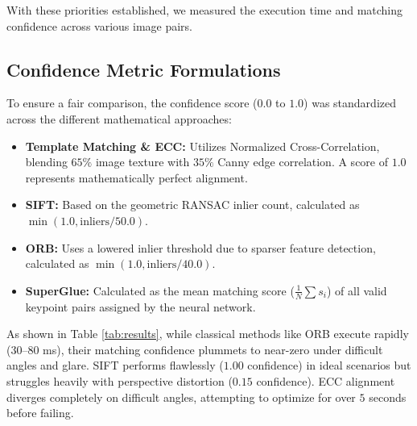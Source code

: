 \documentclass[conference]{IEEEtran}
\begin{document}
With these priorities established, we measured the execution time and matching confidence across various image pairs.





\subsection{Confidence Metric Formulations}

To ensure a fair comparison, the confidence score ($0.0$ to $1.0$) was standardized across the different mathematical approaches:
\begin{itemize}[noitemsep]
    \item \textbf{Template Matching \& ECC:} Utilizes Normalized Cross-Correlation, blending $65\%$ image texture with $35\%$ Canny edge correlation. A score of $1.0$ represents mathematically perfect alignment.
    \item \textbf{SIFT:} Based on the geometric RANSAC inlier count, calculated as $\min(1.0, \text{inliers} / 50.0)$.
    \item \textbf{ORB:} Uses a lowered inlier threshold due to sparser feature detection, calculated as $\min(1.0, \text{inliers} / 40.0)$.
    \item \textbf{SuperGlue:} Calculated as the mean matching score ($\frac{1}{N} \sum s_i$) of all valid keypoint pairs assigned by the neural network.
\end{itemize}




As shown in Table \ref{tab:results}, while classical methods like ORB execute rapidly ($30$--$80$ ms), their matching confidence plummets to near-zero under difficult angles and glare. SIFT performs flawlessly ($1.00$ confidence) in ideal scenarios but struggles heavily with perspective distortion ($0.15$ confidence). ECC alignment diverges completely on difficult angles, attempting to optimize for over $5$ seconds before failing. 

\begin{table}[htbp]
\centering
\caption{Performance Comparison across Image Pairs (Confidence / Execution Time)}
\label{tab:results}
\end{table}
\end{document}
